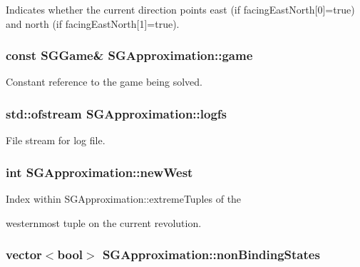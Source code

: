 Indicates whether the current direction points east (if facing\-East\-North\mbox{[}0\mbox{]}=true) and north (if facing\-East\-North\mbox{[}1\mbox{]}=true). \hypertarget{classSGApproximation_a3244a3d7de5f2b909d438f5b4ab337ee}{
\subsubsection[{game}]{\setlength{\rightskip}{0pt plus 5cm}const {\bf S\-G\-Game}\& S\-G\-Approximation\-::game\hspace{0.3cm}{\ttfamily [private]}}}\label{classSGApproximation_a3244a3d7de5f2b909d438f5b4ab337ee}
Constant reference to the game being solved. \hypertarget{classSGApproximation_a3c938c255cddce7cc0483e223bf09b65}{
\subsubsection[{logfs}]{\setlength{\rightskip}{0pt plus 5cm}std\-::ofstream S\-G\-Approximation\-::logfs\hspace{0.3cm}{\ttfamily [private]}}}\label{classSGApproximation_a3c938c255cddce7cc0483e223bf09b65}
File stream for log file. \hypertarget{classSGApproximation_a82f819dc38d837e69d60225823a64671}{
\subsubsection[{new\-West}]{\setlength{\rightskip}{0pt plus 5cm}int S\-G\-Approximation\-::new\-West\hspace{0.3cm}{\ttfamily [private]}}}\label{classSGApproximation_a82f819dc38d837e69d60225823a64671}
\begin{DoxyVerb}       Index within SGApproximation::extremeTuples of the
\end{DoxyVerb}
 westernmost tuple on the current revolution. \hypertarget{classSGApproximation_a42b53c0e82dfa456f3153bcc79185dcd}{
\subsubsection[{non\-Binding\-States}]{\setlength{\rightskip}{0pt plus 5cm}vector$<$bool$>$ S\-G\-Approximation\-::non\-Binding\-States\hspace{0.3cm}{\ttfamily [private]}}}\label{classSGApproximation_a42b53c0e82dfa456f3153bcc79185dcd}
